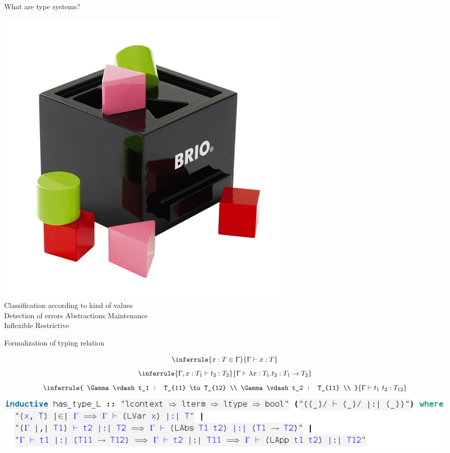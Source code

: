 \documentclass[xcolor=dvipsnames,notes]{beamer}
\begin{document}
\begin{frame}{What are type systems?}
  \begin{center}
    \includegraphics[scale=1]{shape_toy.jpg} \\
    Classification according to kind of values \\
    \bigskip
    \textcolor{OliveGreen}{Detection of errors \qquad Abstractions \qquad Maintenance} \\
    \textcolor{BrickRed}{Inflexible \qquad Restrictive}
  \end{center}
\end{frame}

\begin{frame}{Formalization of typing relation}
  \begin{center}
    \small
    \begin{displaymath}
      \inferrule {x : T \in \Gamma}{\Gamma \vdash x : T}
    \end{displaymath}
    \begin{displaymath}
      \inferrule {\Gamma, x : T_1 \vdash t_2 : T_2}
      {\Gamma \vdash \lambda x : T_1 . t_2 : T_1 \to T_2}
    \end{displaymath}
    \begin{displaymath}
      \inferrule {
        \Gamma \vdash t_1 : T_{11} \to T_{12} \\
        \Gamma \vdash t_2 : T_{11} \\
      }
      {\Gamma \vdash t_1 \ t_2 : T_{12}}
    \end{displaymath}
    \vspace{20pt}
    \includegraphics[scale=0.4]{has_type.png}
  \end{center}
\end{frame}
\end{document}
